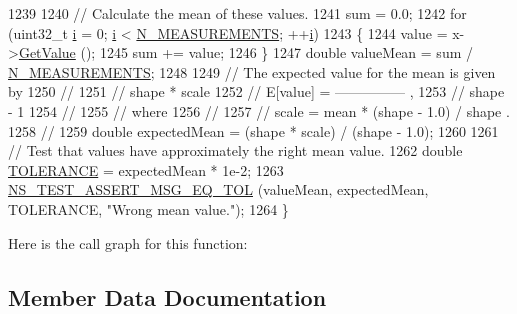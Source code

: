 \begin{DoxyCode}
1239 
1240   \textcolor{comment}{// Calculate the mean of these values.}
1241   sum = 0.0;
1242   \textcolor{keywordflow}{for} (uint32\_t \hyperlink{bernuolliDistribution_8m_a6f6ccfcf58b31cb6412107d9d5281426}{i} = 0; \hyperlink{bernuolliDistribution_8m_a6f6ccfcf58b31cb6412107d9d5281426}{i} < \hyperlink{classRandomVariableStreamParetoAntitheticTestCase_a776b9649927ade74453b83dd35e0a43e}{N\_MEASUREMENTS}; ++\hyperlink{bernuolliDistribution_8m_a6f6ccfcf58b31cb6412107d9d5281426}{i})
1243     \{
1244       value = x->\hyperlink{classns3_1_1ParetoRandomVariable_a382e896b56412a86d009c4ec6140c2c5}{GetValue} ();
1245       sum += value;
1246     \}
1247   \textcolor{keywordtype}{double} valueMean = sum / \hyperlink{classRandomVariableStreamParetoAntitheticTestCase_a776b9649927ade74453b83dd35e0a43e}{N\_MEASUREMENTS};
1248 
1249   \textcolor{comment}{// The expected value for the mean is given by}
1250   \textcolor{comment}{//}
1251   \textcolor{comment}{//                   shape * scale}
1252   \textcolor{comment}{//     E[value]  =  ---------------  ,}
1253   \textcolor{comment}{//                     shape - 1}
1254   \textcolor{comment}{// }
1255   \textcolor{comment}{// where}
1256   \textcolor{comment}{// }
1257   \textcolor{comment}{//     scale  =  mean * (shape - 1.0) / shape .}
1258   \textcolor{comment}{//}
1259   \textcolor{keywordtype}{double} expectedMean = (shape * scale) / (shape - 1.0);
1260 
1261   \textcolor{comment}{// Test that values have approximately the right mean value.}
1262   \textcolor{keywordtype}{double} \hyperlink{spectrum-value-test_8cc_a30c17564229ec2e37dfea9c6c9ad643e}{TOLERANCE} = expectedMean * 1e-2;
1263   \hyperlink{group__testing_ga9e7861b56b4e70db3b56044cb7a28e41}{NS\_TEST\_ASSERT\_MSG\_EQ\_TOL} (valueMean, expectedMean, TOLERANCE, \textcolor{stringliteral}{"Wrong mean
       value."}); 
1264 \}
\end{DoxyCode}


Here is the call graph for this function\+:




\subsection{Member Data Documentation}
